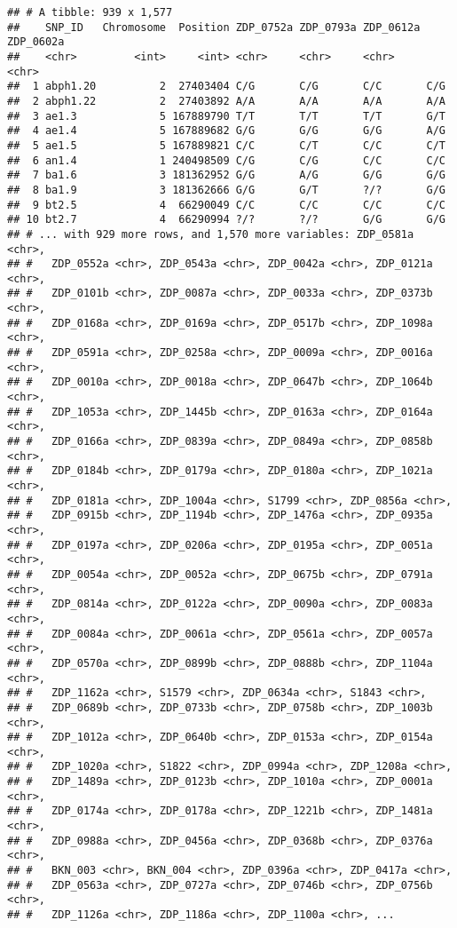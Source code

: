 \documentclass[]{article}
\begin{document}
\begin{verbatim}
## # A tibble: 939 x 1,577
##    SNP_ID   Chromosome  Position ZDP_0752a ZDP_0793a ZDP_0612a ZDP_0602a
##    <chr>         <int>     <int> <chr>     <chr>     <chr>     <chr>    
##  1 abph1.20          2  27403404 C/G       C/G       C/C       C/G      
##  2 abph1.22          2  27403892 A/A       A/A       A/A       A/A      
##  3 ae1.3             5 167889790 T/T       T/T       T/T       G/T      
##  4 ae1.4             5 167889682 G/G       G/G       G/G       A/G      
##  5 ae1.5             5 167889821 C/C       C/T       C/C       C/T      
##  6 an1.4             1 240498509 C/G       C/G       C/C       C/C      
##  7 ba1.6             3 181362952 G/G       A/G       G/G       G/G      
##  8 ba1.9             3 181362666 G/G       G/T       ?/?       G/G      
##  9 bt2.5             4  66290049 C/C       C/C       C/C       C/C      
## 10 bt2.7             4  66290994 ?/?       ?/?       G/G       G/G      
## # ... with 929 more rows, and 1,570 more variables: ZDP_0581a <chr>,
## #   ZDP_0552a <chr>, ZDP_0543a <chr>, ZDP_0042a <chr>, ZDP_0121a <chr>,
## #   ZDP_0101b <chr>, ZDP_0087a <chr>, ZDP_0033a <chr>, ZDP_0373b <chr>,
## #   ZDP_0168a <chr>, ZDP_0169a <chr>, ZDP_0517b <chr>, ZDP_1098a <chr>,
## #   ZDP_0591a <chr>, ZDP_0258a <chr>, ZDP_0009a <chr>, ZDP_0016a <chr>,
## #   ZDP_0010a <chr>, ZDP_0018a <chr>, ZDP_0647b <chr>, ZDP_1064b <chr>,
## #   ZDP_1053a <chr>, ZDP_1445b <chr>, ZDP_0163a <chr>, ZDP_0164a <chr>,
## #   ZDP_0166a <chr>, ZDP_0839a <chr>, ZDP_0849a <chr>, ZDP_0858b <chr>,
## #   ZDP_0184b <chr>, ZDP_0179a <chr>, ZDP_0180a <chr>, ZDP_1021a <chr>,
## #   ZDP_0181a <chr>, ZDP_1004a <chr>, S1799 <chr>, ZDP_0856a <chr>,
## #   ZDP_0915b <chr>, ZDP_1194b <chr>, ZDP_1476a <chr>, ZDP_0935a <chr>,
## #   ZDP_0197a <chr>, ZDP_0206a <chr>, ZDP_0195a <chr>, ZDP_0051a <chr>,
## #   ZDP_0054a <chr>, ZDP_0052a <chr>, ZDP_0675b <chr>, ZDP_0791a <chr>,
## #   ZDP_0814a <chr>, ZDP_0122a <chr>, ZDP_0090a <chr>, ZDP_0083a <chr>,
## #   ZDP_0084a <chr>, ZDP_0061a <chr>, ZDP_0561a <chr>, ZDP_0057a <chr>,
## #   ZDP_0570a <chr>, ZDP_0899b <chr>, ZDP_0888b <chr>, ZDP_1104a <chr>,
## #   ZDP_1162a <chr>, S1579 <chr>, ZDP_0634a <chr>, S1843 <chr>,
## #   ZDP_0689b <chr>, ZDP_0733b <chr>, ZDP_0758b <chr>, ZDP_1003b <chr>,
## #   ZDP_1012a <chr>, ZDP_0640b <chr>, ZDP_0153a <chr>, ZDP_0154a <chr>,
## #   ZDP_1020a <chr>, S1822 <chr>, ZDP_0994a <chr>, ZDP_1208a <chr>,
## #   ZDP_1489a <chr>, ZDP_0123b <chr>, ZDP_1010a <chr>, ZDP_0001a <chr>,
## #   ZDP_0174a <chr>, ZDP_0178a <chr>, ZDP_1221b <chr>, ZDP_1481a <chr>,
## #   ZDP_0988a <chr>, ZDP_0456a <chr>, ZDP_0368b <chr>, ZDP_0376a <chr>,
## #   BKN_003 <chr>, BKN_004 <chr>, ZDP_0396a <chr>, ZDP_0417a <chr>,
## #   ZDP_0563a <chr>, ZDP_0727a <chr>, ZDP_0746b <chr>, ZDP_0756b <chr>,
## #   ZDP_1126a <chr>, ZDP_1186a <chr>, ZDP_1100a <chr>, ...
\end{verbatim}
\end{document}
